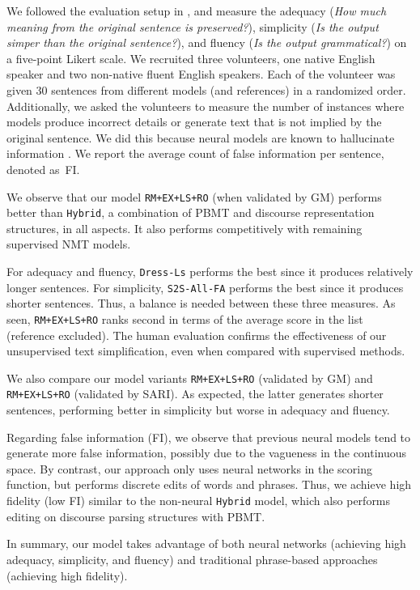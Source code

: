 \documentclass[11pt,a4paper]{article}
\begin{document}
We followed the evaluation setup in , and measure the adequacy (\textit{How much meaning from the original sentence is preserved?}), simplicity (\textit{Is the output simper than the original sentence?}), and fluency (\textit{Is the output grammatical?}) on a five-point Likert scale.  We recruited three volunteers, one native English speaker and two non-native fluent English speakers. Each of the volunteer was given 30 sentences from different models (and references) in a randomized order. Additionally, we asked the volunteers to measure the number of instances where models produce incorrect details or generate text that is not implied by the original sentence.
We did this because neural models are known to hallucinate information \cite{rohrbach2018object}.
We report the average count of false information per sentence, denoted as~FI.



We observe that our model {\tt RM+EX+LS+RO} (when validated by GM) performs better than {\tt Hybrid}, a combination of PBMT and discourse representation structures, in all aspects. It also performs competitively with remaining supervised NMT models. 

For adequacy and fluency, {\tt Dress-Ls} performs the best since it produces relatively longer sentences. For simplicity, {\tt S2S-All-FA} performs the best since it produces shorter sentences. 
Thus, a balance is needed between these three measures. As seen, {\tt RM+EX+LS+RO} ranks second in terms of the average score in the list (reference excluded). The human evaluation confirms the effectiveness of our unsupervised text simplification, even when compared with supervised methods. 


We also compare our model variants {\tt RM+EX+LS+RO} (validated by GM) and {\tt RM+EX+LS+RO} (validated by SARI). As expected, the latter generates shorter sentences, performing better in simplicity but worse in adequacy and fluency. 

Regarding false information (FI), we observe that previous neural models tend to generate more false information, possibly due to the vagueness in the continuous space. 
By contrast, our approach only uses neural networks in the scoring function, but performs discrete edits of words and phrases. Thus, we achieve high fidelity (low FI) similar to the non-neural {\tt Hybrid} model, which also performs editing on discourse parsing structures with PBMT.

In summary, our model takes advantage of both neural networks (achieving high adequacy, simplicity, and fluency) and traditional phrase-based approaches (achieving high fidelity).
\end{document}
